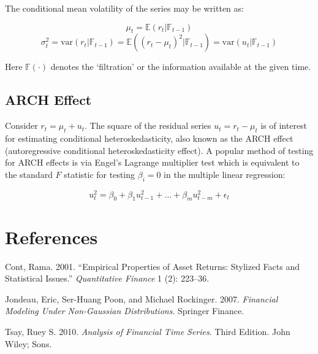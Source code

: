 \documentclass[11pt,]{article}
\begin{document}
The conditional mean volatility of the series may be written as:

\[\mu_t = \mathbb{E}(r_t|\mathbb{F}_{t-1})\]
\[\sigma_t^2 = \text{var}(r_t|\mathbb{F}_{t-1}) = \mathbb{E}((r_t-\mu_t)^2|\mathbb{F}_{t-1})
=\text{var}(u_t|\mathbb{F}_{t-1})\]

Here \(\mathbb{F}(\cdot)\) denotes the `filtration' or the information
available at the given time.

\subsection{ARCH Effect}\label{arch-effect}

Consider \(r_t = \mu_t + u_t\). The square of the residual series
\(u_t = r_t - \mu_t\) is of interest for estimating conditional
heteroskedasticity, also known as the ARCH effect (autoregressive
conditional heteroskedasticity effect). A popular method of testing for
ARCH effects is via Engel's Lagrange multiplier test which is equivalent
to the standard \(F\) statistic for testing \(\beta_i=0\) in the
multiple linear regression:

\[u_t^2 = \beta_0 + \beta_1u_{t-1}^2 + \hdots + \beta_m u_{t-m}^2 + \epsilon_t \]

\section*{References}\label{references}

\hypertarget{refs}{}
\hypertarget{ref-Cont:2001}{}
Cont, Rama. 2001. ``Empirical Properties of Asset Returns: Stylized
Facts and Statistical Issues.'' \emph{Quantitative Finance} 1 (2):
223--36.

\hypertarget{ref-Jondeau_Poon_Rockinger:2007}{}
Jondeau, Eric, Ser-Huang Poon, and Michael Rockinger. 2007.
\emph{Financial Modeling Under Non-Gaussian Distributions}. Springer
Finance.

\hypertarget{ref-Tsay:2010}{}
Tsay, Ruey S. 2010. \emph{Analysis of Financial Time Series}. Third
Edition. John Wiley; Sons.
\end{document}
